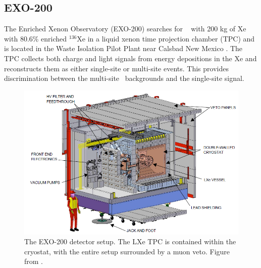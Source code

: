 \subsection{EXO-200}
The Enriched Xenon Observatory (EXO-200) searches for \zeronubb~ with 200 kg of Xe with 80.6\% enriched $^{136}$Xe in a liquid xenon time projection chamber (TPC) and is located in the Waste Isolation Pilot Plant near Calsbad New Mexico \cite{Albert:2017owj}.
The TPC collects both charge and light signals from energy depositions in the Xe and reconstructs them as either single-site or multi-site events.
This provides discrimination between the multi-site \gamma~backgrounds and the single-site signal.
\begin{figure}[htbp]
    \centering
    \includegraphics[width=0.7\linewidth]{Figures/EXO.png}
    \caption[The EXO-200 detector setup.]
    {The EXO-200 detector setup.
    The LXe TPC is contained within the cryostat, with the entire setup surrounded by a muon veto.
    Figure from \cite{Auger:2012gs}.}
    \label{fig:EXO}
\end{figure}

